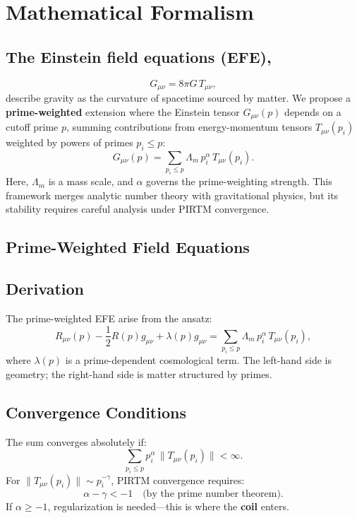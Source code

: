 \documentclass[12pt]{article}
\theoremstyle{plain}
\begin{document}
\section{Mathematical Formalism}
\subsection{The Einstein field equations (EFE),}
\[
G_{\mu\nu} = 8\pi G \, T_{\mu\nu},
\]
describe gravity as the curvature of spacetime sourced by matter. We propose a \textbf{prime-weighted} extension where the Einstein tensor \( G_{\mu\nu}(p) \) depends on a cutoff prime \( p \), summing contributions from energy-momentum tensors \( T_{\mu\nu}(p_i) \) weighted by powers of primes \( p_i \leq p \):
\[
G_{\mu\nu}(p) = \sum_{p_i \leq p} \Lambda_m \, p_i^\alpha \, T_{\mu\nu}(p_i).
\]
Here, \( \Lambda_m \) is a mass scale, and \( \alpha \) governs the prime-weighting strength. This framework merges analytic number theory with gravitational physics, but its stability requires careful analysis under PIRTM convergence.

\subsection{Prime-Weighted Field Equations}
\subsection{Derivation}
The prime-weighted EFE arise from the ansatz:
\[
R_{\mu\nu}(p) - \frac{1}{2} R(p) g_{\mu\nu} + \lambda(p) g_{\mu\nu} = \sum_{p_i \leq p} \Lambda_m \, p_i^\alpha \, T_{\mu\nu}(p_i),
\]
where \( \lambda(p) \) is a prime-dependent cosmological term. The left-hand side is geometry; the right-hand side is matter structured by primes.

\subsection{Convergence Conditions}
The sum converges absolutely if:
\[
\sum_{p_i \leq p} p_i^\alpha \, \|T_{\mu\nu}(p_i)\| < \infty.
\]
For \( \|T_{\mu\nu}(p_i)\| \sim p_i^{-\gamma} \), PIRTM convergence requires:
\[
\alpha - \gamma < -1 \quad \text{(by the prime number theorem)}.
\]
If \( \alpha \geq -1 \), regularization is needed—this is where the \textbf{coil} enters.
\end{document}
